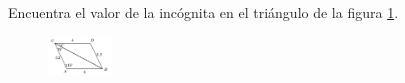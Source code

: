 \question[10]  Encuentra el valor de la incógnita en el triángulo de la figura \ref{fig:angle_triangle_17}.
\begin{figure}[H]
    \begin{center}
        \includegraphics[width=0.15\textwidth]{../images/angle_triangle_17.png}
    \end{center}
    \caption{}
    \label{fig:angle_triangle_17}
\end{figure}